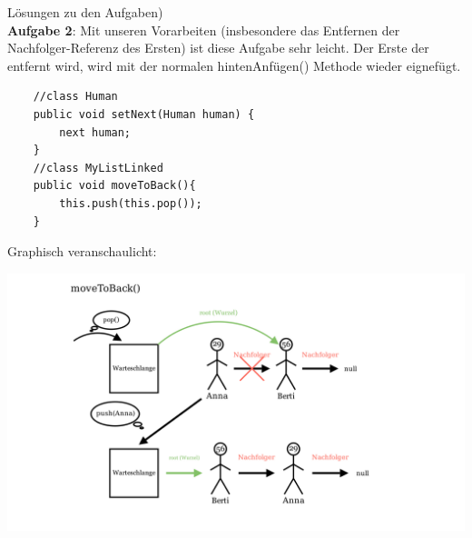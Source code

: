 \documentclass{article}
\begin{document}
Lösungen zu den Aufgaben)\\
\textbf{Aufgabe 2}:
Mit unseren Vorarbeiten (insbesondere das Entfernen der Nachfolger-Referenz des Ersten) ist diese Aufgabe sehr leicht. 
Der Erste der entfernt wird, wird mit der normalen hintenAnfügen() Methode wieder eignefügt. 
\begin{verbatim}
    //class Human 
    public void setNext(Human human) {
        next human;
    }
    //class MyListLinked
    public void moveToBack(){
        this.push(this.pop());
    }
\end{verbatim}
Graphisch veranschaulicht:
\begin{center}
    \includegraphics[scale = 0.25]{../media/linked_moveToBack.png}
\end{center}
\end{document}
